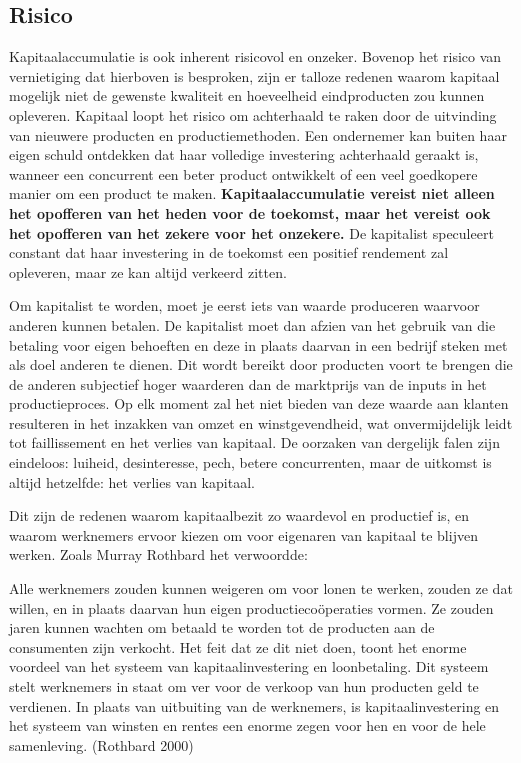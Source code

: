 \documentclass[
  a5paper,
  smalldemyvopaper,11pt,twoside,onecolumn,openright,extrafontsizes,
hidelinks]{memoir}
\begin{document}
\subsection{Risico}\label{risico}

Kapitaalaccumulatie is ook inherent risicovol en onzeker. Bovenop het
risico van vernietiging dat hierboven is besproken, zijn er talloze
redenen waarom kapitaal mogelijk niet de gewenste kwaliteit en
hoeveelheid eindproducten zou kunnen opleveren. Kapitaal loopt het
risico om achterhaald te raken door de uitvinding van nieuwere producten
en productiemethoden. Een ondernemer kan buiten haar eigen schuld
ontdekken dat haar volledige investering achterhaald geraakt is, wanneer
een concurrent een beter product ontwikkelt of een veel goedkopere
manier om een product te maken. \textbf{Kapitaalaccumulatie vereist niet
alleen het opofferen van het heden voor de toekomst, maar het vereist
ook het opofferen van het zekere voor het onzekere.} De kapitalist
speculeert constant dat haar investering in de toekomst een positief
rendement zal opleveren, maar ze kan altijd verkeerd zitten.

Om kapitalist te worden, moet je eerst iets van waarde produceren
waarvoor anderen kunnen betalen. De kapitalist moet dan afzien van het
gebruik van die betaling voor eigen behoeften en deze in plaats daarvan
in een bedrijf steken met als doel anderen te dienen. Dit wordt bereikt
door producten voort te brengen die de anderen subjectief hoger
waarderen dan de marktprijs van de inputs in het productieproces. Op elk
moment zal het niet bieden van deze waarde aan klanten resulteren in het
inzakken van omzet en winstgevendheid, wat onvermijdelijk leidt tot
faillissement en het verlies van kapitaal. De oorzaken van dergelijk
falen zijn eindeloos: luiheid, desinteresse, pech, betere concurrenten,
maar de uitkomst is altijd hetzelfde: het verlies van kapitaal.

Dit zijn de redenen waarom kapitaalbezit zo waardevol en productief is,
en waarom werknemers ervoor kiezen om voor eigenaren van kapitaal te
blijven werken. Zoals Murray Rothbard het verwoordde:

Alle werknemers zouden kunnen weigeren om voor lonen te werken, zouden
ze dat willen, en in plaats daarvan hun eigen productiecoöperaties
vormen. Ze zouden jaren kunnen wachten om betaald te worden tot de
producten aan de consumenten zijn verkocht. Het feit dat ze dit niet
doen, toont het enorme voordeel van het systeem van kapitaalinvestering
en loonbetaling. Dit systeem stelt werknemers in staat om ver voor de
verkoop van hun producten geld te verdienen. In plaats van uitbuiting
van de werknemers, is kapitaalinvestering en het systeem van winsten en
rentes een enorme zegen voor hen en voor de hele samenleving. (Rothbard
2000)
\end{document}

